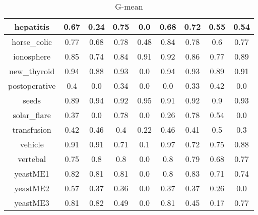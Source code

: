\begin{table}[h]
\begin{center}
{\begin{tabular}{|c|c|c|c|c|c|c|c|c|}
						\hline%
						hepatitis&0.67&0.24&0.75&0.0&0.68&0.72&0.55&0.54\\%
						\hline%
						horse\_colic&0.77&0.68&0.78&0.48&0.84&0.78&0.6&0.77\\%
						\hline%
						ionosphere&0.85&0.74&0.84&0.91&0.92&0.86&0.77&0.89\\%
						\hline%
						new\_thyroid&0.94&0.88&0.93&0.0&0.94&0.93&0.89&0.91\\%
						\hline%
						postoperative&0.4&0.0&0.34&0.0&0.0&0.33&0.42&0.0\\%
						\hline%
						seeds&0.89&0.94&0.92&0.95&0.91&0.92&0.9&0.93\\%
						\hline%
						solar\_flare&0.37&0.0&0.78&0.0&0.26&0.78&0.54&0.0\\%
						\hline%
						transfusion&0.42&0.46&0.4&0.22&0.46&0.41&0.5&0.3\\%
						\hline%
						vehicle&0.91&0.91&0.71&0.1&0.97&0.72&0.75&0.88\\%
						\hline%
						vertebal&0.75&0.8&0.8&0.0&0.8&0.79&0.68&0.77\\%
						\hline%
						yeastME1&0.82&0.81&0.81&0.0&0.8&0.83&0.71&0.74\\%
						\hline%
						yeastME2&0.57&0.37&0.36&0.0&0.37&0.37&0.26&0.0\\%
						\hline%
						yeastME3&0.81&0.82&0.49&0.0&0.81&0.45&0.17&0.77\\%
						\hline%
					\end{tabular}}%
					\caption{G-mean}
					\label{tab3}
				\end{center}
			\end{table}
			
